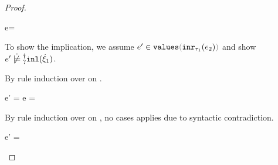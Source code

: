 \begin{proof}
\begin{byCases}
\begin{byCases}
\begin{byCases}
            \item[\text{(\ref{rule:VInr}, \ref{rule:TInr})}]
              \begin{pfsteps}
              \item e= 
              \end{pfsteps}
              To show the implication, we assume $\inValues{e'}{\hinr{\tau_1}{e_2}}$ and show $\cnotsatisfyormay{e'}{\cinl{\hxi_1}}$.
              \begin{pfsteps}
              \item {}  
              \end{pfsteps}
              By rule induction over  on .
              \begin{byCases}
                \item[\text{(\ref{rule:IVVal})}]
                \begin{pfsteps}
                \item e' = e =  
                \item {} 
                \end{pfsteps}

                \item[\text{(\ref{rule:IVIndet})}]
                  \begin{pfsteps}
                  \item {}  
                  \end{pfsteps}
                  By rule induction over  on
                  , no cases applies due to syntactic contradiction.

                \item[\text{(\ref{rule:IVInr})}]
                  \begin{pfsteps}
                  \item e' =  
                  \item {} 
                  \end{pfsteps}


\end{byCases}
\end{byCases}
\end{byCases}
\end{byCases}
\end{proof}
